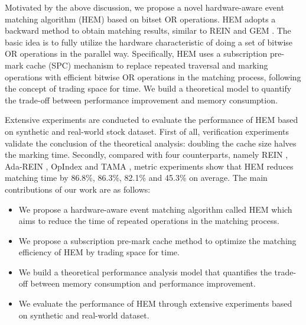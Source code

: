 \documentclass[runningheads]{llncs}
\begin{document}
Motivated by the above discussion, we propose a novel hardware-aware event matching algorithm (HEM) based on bitset OR operations. 
HEM adopts a backward method to obtain matching results, similar to REIN \cite{REIN} and GEM \cite{GEM}.
The basic idea is to fully utilize the hardware characteristic of doing a set of bitwise OR operations in the parallel way. 
Specifically, HEM uses a subscription pre-mark cache (SPC) mechanism to replace repeated traversal and marking operations with efficient bitwise OR operations in the matching process, following the concept of trading space for time. We build a theoretical model to quantify the trade-off between performance improvement and memory consumption.

 Extensive experiments are conducted to evaluate the performance of HEM based on synthetic and real-world stock dataset. First of all, verification experiments validate the conclusion of the theoretical analysis: doubling the cache size halves the marking time. Secondly, compared with four counterparts, namely REIN \cite{REIN}, Ada-REIN \cite{Ada-REIN}, OpIndex \cite{OpIndex} and TAMA \cite{TAMA}, metric experiments show that HEM reduces matching time by 86.8\%, 86.3\%, 82.1\% and 45.3\% on average. 
The main contributions of our work are as follows:
\begin{itemize}
    \item We propose a hardware-aware event matching algorithm called HEM which aims to reduce the time of repeated operations in the matching process.  
    
    \item We propose a subscription pre-mark cache method to optimize the matching efficiency of HEM by trading space for time.
    
    \item We build a theoretical performance analysis model that quantifies the trade-off between memory consumption and performance improvement. 
    
    \item We evaluate the performance of HEM through extensive experiments based on synthetic and real-world dataset.
\end{itemize}
\end{document}
